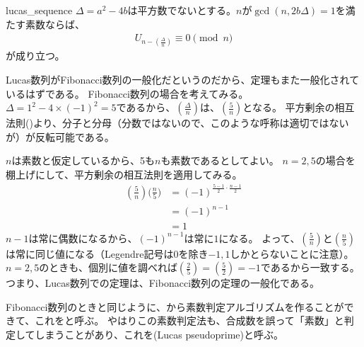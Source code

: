 \begin{Theo}{}{lucas_sequence}
$\Delta=a^2-4b$は平方数でないとする。$n$が$\gcd(n, 2b\Delta)=1$を満たす素数ならば、
\begin{align*}
U_{n - \left(\frac{\Delta}{n}\right)} \equiv 0 \pmod{n}
\end{align*}
が成り立つ。
\end{Theo}

Lucas数列がFibonacci数列の一般化だというのだから、定理もまた一般化されているはずである。
Fibonacci数列の場合を考えてみる。
$\Delta = 1^2-4\times(-1)^2=5$であるから、$\left(\frac{\Delta}{n}\right)$は、$\left(\frac{5}{n}\right)$となる。
平方剰余の相互法則()より、分子と分母（分数ではないので、このような呼称は適切ではないが）が反転可能である。

$n$は素数と仮定しているから、5も$n$も素数であるとしてよい。
$n=2, 5$の場合を棚上げにして、平方剰余の相互法則を適用してみる。
\begin{align*}
\left(\frac{5}{n}\right) \bigg(\frac{n}{5}\bigg) &= (-1)^{\frac{5-1}{2}\cdot\frac{n-1}{2}}\\
&= (-1)^{n-1}\\
&= 1
\end{align*}
$n-1$は常に偶数になるから、$(-1)^{n-1}$は常に$1$になる。
よって、$\left(\frac{5}{n}\right)$と$\left(\frac{n}{5}\right)$は常に同じ値になる（Legendre記号は$0$を除き$-1,1$しかとらないことに注意）。
$n=2, 5$のときも、個別に値を調べれば$\left(\frac{2}{5}\right) = \left(\frac{5}{2}\right) = -1$であるから一致する。
つまり、Lucas数列での定理は、Fibonacci数列の定理の一般化である。

Fibonacci数列のときと同じように、から素数判定アルゴリズムを作ることができて、これをと呼ぶ。
やはりこの素数判定法も、合成数を誤って「素数」と判定してしまうことがあり、これを(Lucas pseudoprime)と呼ぶ。

